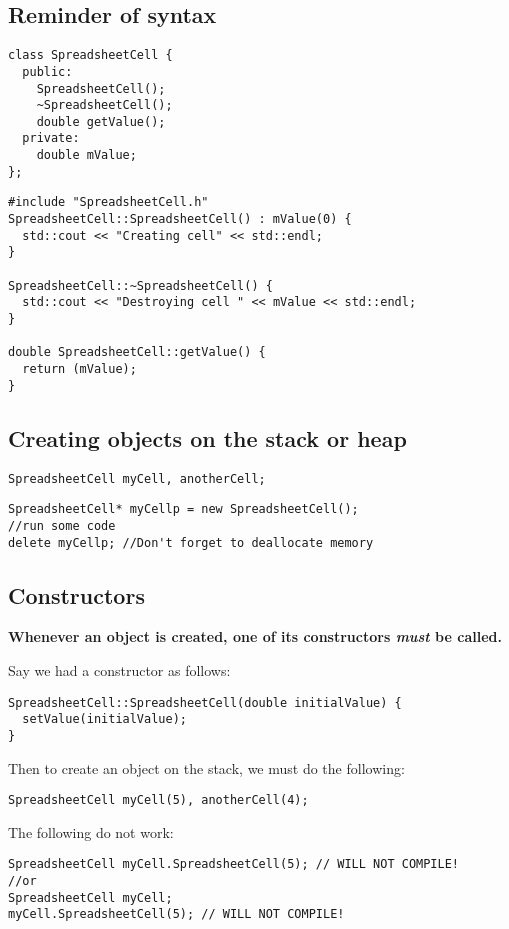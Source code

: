 \documentclass[a4paper,12pt]{article}
\begin{document}
\subsection{Reminder of syntax}
\begin{lstlisting}[caption={SpreadsheetCell.h}]
class SpreadsheetCell {
  public:
    SpreadsheetCell();
    ~SpreadsheetCell();
    double getValue();
  private:
    double mValue;
};
\end{lstlisting}
\begin{lstlisting}[caption={SpreadsheetCell.cpp}]
#include "SpreadsheetCell.h"
SpreadsheetCell::SpreadsheetCell() : mValue(0) {
  std::cout << "Creating cell" << std::endl;
}

SpreadsheetCell::~SpreadsheetCell() {
  std::cout << "Destroying cell " << mValue << std::endl;
}

double SpreadsheetCell::getValue() {
  return (mValue);
}
\end{lstlisting}
\subsection{Creating objects on the stack or heap}
\begin{lstlisting}[caption={Creating objects on the stack}]
SpreadsheetCell myCell, anotherCell;
\end{lstlisting}
\begin{lstlisting}[caption={Creating objects on the heap}]
SpreadsheetCell* myCellp = new SpreadsheetCell();
//run some code
delete myCellp; //Don't forget to deallocate memory
\end{lstlisting}

\subsection{Constructors}
\textbf{Whenever an object is created, one of its constructors \emph{must} be called.}

Say we had a constructor as follows:
\begin{lstlisting}
SpreadsheetCell::SpreadsheetCell(double initialValue) {
  setValue(initialValue);
}
\end{lstlisting}
Then to create an object on the stack, we must do the following:
\begin{lstlisting}
SpreadsheetCell myCell(5), anotherCell(4);
\end{lstlisting}
The following do not work:
\begin{lstlisting}
SpreadsheetCell myCell.SpreadsheetCell(5); // WILL NOT COMPILE!
//or
SpreadsheetCell myCell;
myCell.SpreadsheetCell(5); // WILL NOT COMPILE!
\end{lstlisting}
\end{document}
